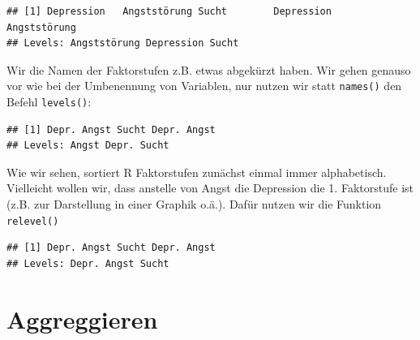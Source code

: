 \documentclass[
]{book}
\newenvironment{Shaded}{\begin{snugshade}}{\end{snugshade}}
\newcommand{\FunctionTok}[1]{\textcolor[rgb]{0.00,0.00,0.00}{#1}}
\newcommand{\NormalTok}[1]{#1}
\newcommand{\OtherTok}[1]{\textcolor[rgb]{0.56,0.35,0.01}{#1}}
\newcommand{\SpecialCharTok}[1]{\textcolor[rgb]{0.00,0.00,0.00}{#1}}
\newcommand{\StringTok}[1]{\textcolor[rgb]{0.31,0.60,0.02}{#1}}
\begin{document}
\begin{verbatim}
## [1] Depression   Angststörung Sucht        Depression   Angststörung
## Levels: Angststörung Depression Sucht
\end{verbatim}

Wir die Namen der Faktorstufen z.B. etwas abgekürzt haben. Wir gehen genauso vor wie bei der Umbenennung von Variablen, nur nutzen wir statt \texttt{names()} den Befehl \texttt{levels()}:

\begin{Shaded}
\end{Shaded}

\begin{verbatim}
## [1] Depr. Angst Sucht Depr. Angst
## Levels: Angst Depr. Sucht
\end{verbatim}

Wie wir sehen, sortiert R Faktorstufen zunächst einmal immer alphabetisch. Vielleicht wollen wir, dass anstelle von Angst die Depression die 1. Faktorstufe ist (z.B. zur Darstellung in einer Graphik o.ä.). Dafür nutzen wir die Funktion \texttt{relevel()}

\begin{Shaded}
\end{Shaded}

\begin{verbatim}
## [1] Depr. Angst Sucht Depr. Angst
## Levels: Depr. Angst Sucht
\end{verbatim}

\hypertarget{aggreggieren}{%
\section{Aggreggieren}\label{aggreggieren}}
\end{document}
